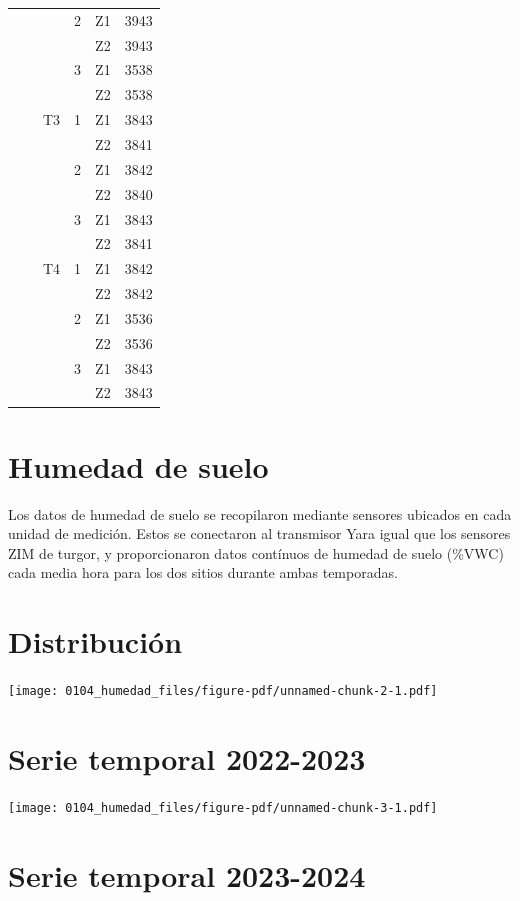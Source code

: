 \documentclass[
  letterpaper,
  DIV=11,
  numbers=noendperiod]{scrreprt}
\begin{document}
\begin{longtable}[]{@{}lllllr@{}}
& & & 2 & Z1 & 3943 \\
& & & & Z2 & 3943 \\
& & & 3 & Z1 & 3538 \\
& & & & Z2 & 3538 \\
& & T3 & 1 & Z1 & 3843 \\
& & & & Z2 & 3841 \\
& & & 2 & Z1 & 3842 \\
& & & & Z2 & 3840 \\
& & & 3 & Z1 & 3843 \\
& & & & Z2 & 3841 \\
& & T4 & 1 & Z1 & 3842 \\
& & & & Z2 & 3842 \\
& & & 2 & Z1 & 3536 \\
& & & & Z2 & 3536 \\
& & & 3 & Z1 & 3843 \\
& & & & Z2 & 3843 \\
\end{longtable}

\chapter{Humedad de suelo}\label{humedad-de-suelo}

Los datos de humedad de suelo se recopilaron mediante sensores ubicados
en cada unidad de medición. Estos se conectaron al transmisor Yara igual
que los sensores ZIM de turgor, y proporcionaron datos contínuos de
humedad de suelo (\%VWC) cada media hora para los dos sitios durante
ambas temporadas.

\chapter{Distribución}

\begin{center}
\texttt{[image: 0104\_humedad\_files/figure-pdf/unnamed-chunk-2-1.pdf]}
\end{center}

\chapter{Serie temporal 2022-2023}

\begin{center}
\texttt{[image: 0104\_humedad\_files/figure-pdf/unnamed-chunk-3-1.pdf]}
\end{center}

\chapter{Serie temporal 2023-2024}
\end{document}
